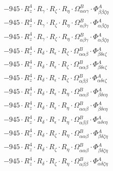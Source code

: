 \documentclass{article}
\begin{document}
\begin{subequations}
\begin{gather}
\begin{array}{c}
 \\[0.2em] 		 - 945 \cdot R_{z}^{4} \cdot R_{\gamma{}} \cdot R_{\zeta{}} \cdot R_{\eta{}} \cdot \Omega{}^{B}_{\alpha{}\alpha{}\gamma{}} \cdot \Phi{}^{A}_{\beta{}\beta{}\zeta{}\eta{}} 
 \\[0.2em] 		 - 945 \cdot R_{z}^{4} \cdot R_{\gamma{}} \cdot R_{\zeta{}} \cdot R_{\eta{}} \cdot \Omega{}^{B}_{\alpha{}\beta{}\gamma{}} \cdot \Phi{}^{A}_{\alpha{}\beta{}\zeta{}\eta{}} 
 \\[0.2em] 		 - 945 \cdot R_{z}^{4} \cdot R_{\gamma{}} \cdot R_{\zeta{}} \cdot R_{\eta{}} \cdot \Omega{}^{B}_{\alpha{}\beta{}\gamma{}} \cdot \Phi{}^{A}_{\alpha{}\beta{}\zeta{}\eta{}} 
 \\[0.2em] 		 - 945 \cdot R_{z}^{4} \cdot R_{\delta{}} \cdot R_{\epsilon{}} \cdot R_{\zeta{}} \cdot \Omega{}^{B}_{\alpha{}\alpha{}\beta{}} \cdot \Phi{}^{A}_{\beta{}\delta{}\epsilon{}\zeta{}} 
 \\[0.2em] 		 - 945 \cdot R_{z}^{4} \cdot R_{\delta{}} \cdot R_{\epsilon{}} \cdot R_{\zeta{}} \cdot \Omega{}^{B}_{\alpha{}\alpha{}\beta{}} \cdot \Phi{}^{A}_{\beta{}\delta{}\epsilon{}\zeta{}} 
 \\[0.2em] 		 - 945 \cdot R_{z}^{4} \cdot R_{\delta{}} \cdot R_{\epsilon{}} \cdot R_{\zeta{}} \cdot \Omega{}^{B}_{\alpha{}\beta{}\beta{}} \cdot \Phi{}^{A}_{\alpha{}\delta{}\epsilon{}\zeta{}} 
 \\[0.2em] 		 - 945 \cdot R_{z}^{4} \cdot R_{\delta{}} \cdot R_{\epsilon{}} \cdot R_{\eta{}} \cdot \Omega{}^{B}_{\alpha{}\alpha{}\beta{}} \cdot \Phi{}^{A}_{\beta{}\delta{}\epsilon{}\eta{}} 
 \\[0.2em] 		 - 945 \cdot R_{z}^{4} \cdot R_{\delta{}} \cdot R_{\epsilon{}} \cdot R_{\eta{}} \cdot \Omega{}^{B}_{\alpha{}\alpha{}\beta{}} \cdot \Phi{}^{A}_{\beta{}\delta{}\epsilon{}\eta{}} 
 \\[0.2em] 		 - 945 \cdot R_{z}^{4} \cdot R_{\delta{}} \cdot R_{\epsilon{}} \cdot R_{\eta{}} \cdot \Omega{}^{B}_{\alpha{}\beta{}\beta{}} \cdot \Phi{}^{A}_{\alpha{}\delta{}\epsilon{}\eta{}} 
 \\[0.2em] 		 - 945 \cdot R_{z}^{4} \cdot R_{\delta{}} \cdot R_{\zeta{}} \cdot R_{\eta{}} \cdot \Omega{}^{B}_{\alpha{}\alpha{}\beta{}} \cdot \Phi{}^{A}_{\beta{}\delta{}\zeta{}\eta{}} 
 \\[0.2em] 		 - 945 \cdot R_{z}^{4} \cdot R_{\delta{}} \cdot R_{\zeta{}} \cdot R_{\eta{}} \cdot \Omega{}^{B}_{\alpha{}\alpha{}\beta{}} \cdot \Phi{}^{A}_{\beta{}\delta{}\zeta{}\eta{}} 
 \\[0.2em] 		 - 945 \cdot R_{z}^{4} \cdot R_{\delta{}} \cdot R_{\zeta{}} \cdot R_{\eta{}} \cdot \Omega{}^{B}_{\alpha{}\beta{}\beta{}} \cdot \Phi{}^{A}_{\alpha{}\delta{}\zeta{}\eta{}} 

\end{array}
\end{gather}
\end{subequations}
\end{document}
